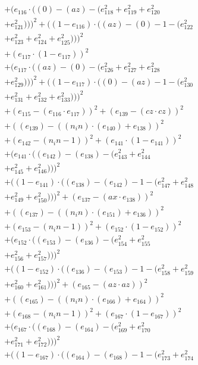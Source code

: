 \documentclass[10pt, a4paper]{article}
\begin{document}
\begin{align*}
& + (e_{116}  \cdot  ((0) - (az) - (e_{118}^{2} + e_{119}^{2} + e_{120}^{2} \\
& + e_{121}^{2})))^{2} + ((1 - e_{116})  \cdot  ((az) - (0) - 1 - (e_{122}^{2} \\
& + e_{123}^{2} + e_{124}^{2} + e_{125}^{2})))^{2} \\
& + (e_{117}  \cdot  (1 - e_{117}))^{2} \\
& + (e_{117}  \cdot  ((az) - (0) - (e_{126}^{2} + e_{127}^{2} + e_{128}^{2} \\
& + e_{129}^{2})))^{2} + ((1 - e_{117})  \cdot  ((0) - (az) - 1 - (e_{130}^{2} \\
& + e_{131}^{2} + e_{132}^{2} + e_{133}^{2})))^{2} \\
& + (e_{115} - (e_{116}  \cdot  e_{117}))^{2} + (e_{139} - (cz  \cdot  cz))^{2} \\
& + ((e_{139}) - ((n_in)  \cdot  (e_{140}) + e_{138}))^{2} \\
& + (e_{142} - (n_in - 1))^{2} + (e_{141}  \cdot  (1 - e_{141}))^{2} \\
& + (e_{141}  \cdot  ((e_{142}) - (e_{138}) - (e_{143}^{2} + e_{144}^{2} \\
& + e_{145}^{2} + e_{146}^{2})))^{2} \\
& + ((1 - e_{141})  \cdot  ((e_{138}) - (e_{142}) - 1 - (e_{147}^{2} + e_{148}^{2} \\
& + e_{149}^{2} + e_{150}^{2})))^{2} + (e_{137} - (ax  \cdot  e_{138}))^{2} \\
& + ((e_{137}) - ((n_in)  \cdot  (e_{151}) + e_{136}))^{2} \\
& + (e_{153} - (n_in - 1))^{2} + (e_{152}  \cdot  (1 - e_{152}))^{2} \\
& + (e_{152}  \cdot  ((e_{153}) - (e_{136}) - (e_{154}^{2} + e_{155}^{2} \\
& + e_{156}^{2} + e_{157}^{2})))^{2} \\
& + ((1 - e_{152})  \cdot  ((e_{136}) - (e_{153}) - 1 - (e_{158}^{2} + e_{159}^{2} \\
& + e_{160}^{2} + e_{161}^{2})))^{2} + (e_{165} - (az  \cdot  az))^{2} \\
& + ((e_{165}) - ((n_in)  \cdot  (e_{166}) + e_{164}))^{2} \\
& + (e_{168} - (n_in - 1))^{2} + (e_{167}  \cdot  (1 - e_{167}))^{2} \\
& + (e_{167}  \cdot  ((e_{168}) - (e_{164}) - (e_{169}^{2} + e_{170}^{2} \\
& + e_{171}^{2} + e_{172}^{2})))^{2} \\
& + ((1 - e_{167})  \cdot  ((e_{164}) - (e_{168}) - 1 - (e_{173}^{2} + e_{174}^{2} \\

\end{align*}
\end{document}
